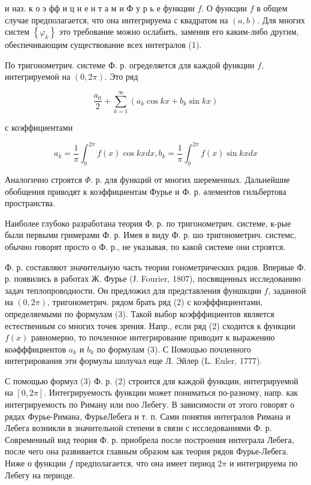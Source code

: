 \documentclass[10pt]{article}
\begin{document}
и наз. к о э фф и ц и е н т а м и Ф у р ь е функции $f$. О функции $f$ в общем случае предполагается, что она интегрируема с квадратом на $(a, b)$. Для многих систем $\left\{\varphi_{k}\right\}$ это требование можно ослабить, заменив его каким-либо другим, обеспечивающим существование всех интегралов (1).



По тригонометрич. системе $Ф$. р. огределяется для каждой функции $f$, интегрируемоӥ на $(0,2 \pi)$. Это ряд



\[

\frac{a_{0}}{2}+\sum_{k=1}^{\infty}\left(a_{k} \cos k x+b_{k} \sin k x\right)

\]



с коэффициентами



\[

a_{k}=\frac{1}{\pi} \int_{0}^{2 \pi} f(x) \cos k x d x, b_{k}=\frac{1}{\pi} \int_{0}^{2 \pi} f(x) \sin k x d x

\]



Аналогично строятся $\Phi$. р. для функций от многих шеременных. Дальнейшие обобщения приводят к коэффициентам Фурье и Ф. р. әлементов гильбертова пространства.



Наиболее глубоко разработана теория Ф. р. по тригонометрич. системе, к-рые были первыми гримерами Ф. р. Имея в виду Ф. р. шо тригонометрич. системс, обычно говорят просто о Ф. р., не указывая, по какой системе они строятся.



Ф. р. составляют значительную часть теории гонометрических рядов. Впервые Ф. р. появились в работах Ж. Фурье (Ј. Fourier, 1807), посвященных исследованию задач теплопроводности. Он предложил для представления фуншкции $f$, заданной на $(0,2 \pi)$, тригонометрич. рядом брать ряд (2) с коэфффициентами, определяемыми по формулам (3). Такой выбор коэфффициентов является естественным со многих точек зрения. Напр., если ряд (2) сходится к функции $f(x)$ равномерно, то почленное интегрирование приводит к выражению коәфффициентов $a_{k}$ и $b_{k}$ по формулам (3). С ІІомощью почленного интегрирования эти формулы шолучал еще Л. Эйлер (L. Euler, 1777).



С помощью формул (3) Ф. р. (2) строится для каждой функции, интегрируемой на $[0,2 \pi]$. Интегрируемость функции может пониматься по-разному, напр. как интегрируемость по Риману или поо Лебегу. В зависимости от этого говорят о рядах Фурье-Римана, ФурьеЛебега и т. п. Сами понятия интегралов Римана и Лебега возникли в значительной степени в связи с исследованиями Ф. р. Современный вид теория Ф. р. приобрела после построения интеграла Лебега, после чего она развивается главным образом как теория рядов Фурье-Лебега. Ниже о функции $f$ предполагается, что она имеет период $2 \pi$ и интегрируема по Лебегу на периоде.
\end{document}
